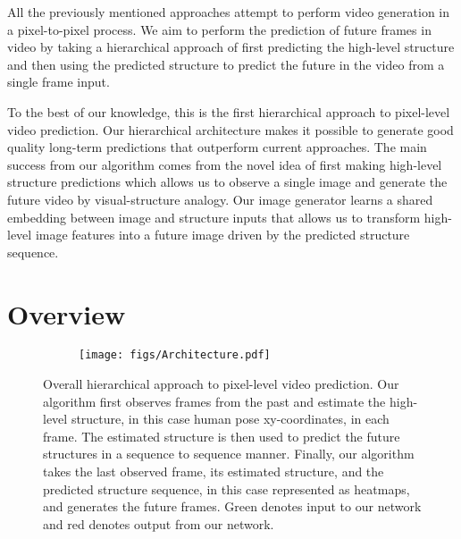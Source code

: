 \documentclass{article}
\newcommand{\p}{{\mathbf{p}}}
\newcommand{\cutsectionup}{\vspace*{-0.1in}}
\newcommand{\cutsectiondown}{\vspace*{-0.05in}}
\newcommand{\cutsectionup}{}
\newcommand{\cutsectiondown}{}
\begin{document}
All the previously mentioned approaches attempt to perform video generation in a pixel-to-pixel process.
We aim to perform the prediction of future frames in video by taking a hierarchical approach of first predicting the high-level structure and then using the predicted structure to predict the future in the video from a single frame input.

To the best of our knowledge, this is the first hierarchical approach to pixel-level video prediction.
Our hierarchical architecture makes it possible to generate good quality long-term predictions that outperform current approaches.
The main success from our algorithm comes from the novel idea of first making high-level structure predictions which allows us to observe a single image and generate the future video by visual-structure analogy.
Our image generator learns a shared embedding between image and structure inputs that allows us to transform high-level image features into a future image driven by the predicted structure sequence.
\cutsectionup\section{Overview}\label{sec:overview}\cutsectiondown\begin{figure*}[t]
    \begin{subfigure}{1\linewidth}
        \centering
	    \texttt{[image: figs/Architecture.pdf]}
	\end{subfigure} 
    \vspace{-0.15in}
    \caption{Overall hierarchical approach to pixel-level video prediction. Our algorithm first observes frames from the past and estimate the high-level structure, in this case human pose xy-coordinates, in each frame. The estimated structure is then used to predict the future structures in a sequence to sequence manner. Finally, our algorithm takes the last observed frame, its estimated structure, and the predicted structure sequence, in this case represented as heatmaps, and generates the future frames. Green denotes input to our network and red denotes output from our network.}
\label{fig:arch}
\vspace{-0.1in}
\end{figure*}%
\end{document}
